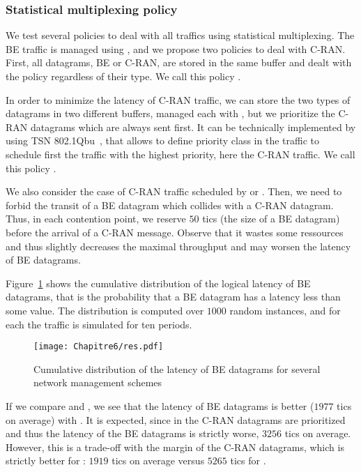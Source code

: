    	\subsubsection{Statistical multiplexing policy}

   	We test several policies to deal with all traffics using statistical multiplexing.
   	The BE traffic is managed using \FIFO, and we propose two policies to deal with C-RAN. First, all datagrams, BE or C-RAN, are stored in the same buffer and dealt with the \FIFO policy regardless of their type. We call this policy \FIFO.

    In order to minimize the latency of C-RAN traffic, we can store the two types of datagrams in two different buffers, managed each with \FIFO, but we prioritize the C-RAN datagrams which are always sent first. It can be technically implemented by using TSN 802.1Qbu~\cite{ieee802}, that allows to define priority class in the traffic to schedule first the traffic with the highest priority, here the C-RAN traffic. We call this policy \framepre.
    
    We also consider the case of C-RAN traffic scheduled by \PMLS or \SPMLS. Then, we need to forbid the transit of a BE datagram which collides with a C-RAN datagram. Thus, in each contention point, we reserve $50$ tics (the size of a BE datagram) before the arrival of a C-RAN message. Observe that it wastes some ressources and thus slightly decreases the maximal throughput and may worsen the latency of BE datagrams.
    
    Figure~\ref{fig:belatency} shows the cumulative distribution of the logical latency of BE datagrams, that is the probability that a BE datagram has a latency less than some value.
    The distribution is computed over $1000$ random instances, and for each the traffic is simulated for ten periods.

     \begin{figure}
       \begin{center}
      \texttt{[image: Chapitre6/res.pdf]}
      \end{center}
      \caption{Cumulative distribution of the latency of BE datagrams for several network management schemes}
      \label{fig:belatency}   
     \end{figure}    
     

     If we compare \FIFO and \framepre, we see that the latency of BE datagrams is better ($1977$ tics on average) with \FIFO. It is expected, since in \framepre the C-RAN datagrams are prioritized and thus 
     the latency of the BE datagrams is strictly worse, $3256$ tics on average. However, this is a trade-off with the margin of the C-RAN datagrams, which is strictly better for \framepre: $1919$ tics on average versus $5265$ tics for \FIFO. 

